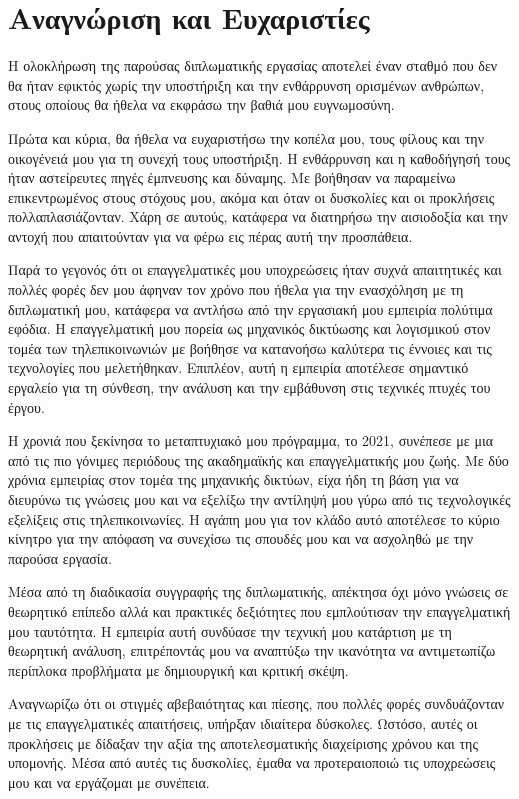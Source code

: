 
\chapter{Αναγνώριση και Ευχαριστίες}

Η ολοκλήρωση της παρούσας διπλωματικής εργασίας αποτελεί έναν σταθμό που δεν θα ήταν εφικτός χωρίς την υποστήριξη και την ενθάρρυνση ορισμένων ανθρώπων, στους οποίους θα ήθελα να εκφράσω την βαθιά μου ευγνωμοσύνη.

Πρώτα και κύρια, θα ήθελα να ευχαριστήσω την κοπέλα μου, τους φίλους και την οικογένειά μου για τη συνεχή τους υποστήριξη. Η ενθάρρυνση και η καθοδήγησή τους ήταν αστείρευτες πηγές έμπνευσης και δύναμης. Με βοήθησαν να παραμείνω επικεντρωμένος στους στόχους μου, ακόμα και όταν οι δυσκολίες και οι προκλήσεις πολλαπλασιάζονταν. Χάρη σε αυτούς, κατάφερα να διατηρήσω την αισιοδοξία και την αντοχή που απαιτούνταν για να φέρω εις πέρας αυτή την προσπάθεια.

Παρά το γεγονός ότι οι επαγγελματικές μου υποχρεώσεις ήταν συχνά απαιτητικές και πολλές φορές δεν μου άφηναν τον χρόνο που ήθελα για την ενασχόληση με τη διπλωματική μου, κατάφερα να αντλήσω από την εργασιακή μου εμπειρία πολύτιμα εφόδια. Η επαγγελματική μου πορεία ως μηχανικός δικτύωσης και λογισμικού στον τομέα των τηλεπικοινωνιών με βοήθησε να κατανοήσω καλύτερα τις έννοιες και τις τεχνολογίες που μελετήθηκαν. Επιπλέον, αυτή η εμπειρία αποτέλεσε σημαντικό εργαλείο για τη σύνθεση, την ανάλυση και την εμβάθυνση στις τεχνικές πτυχές του έργου.

Η χρονιά που ξεκίνησα το μεταπτυχιακό μου πρόγραμμα, το 2021, συνέπεσε με μια από τις πιο γόνιμες περιόδους της ακαδημαϊκής και επαγγελματικής μου ζωής. Με δύο χρόνια εμπειρίας στον τομέα της μηχανικής δικτύων, είχα ήδη τη βάση για να διευρύνω τις γνώσεις μου και να εξελίξω την αντίληψή μου γύρω από τις τεχνολογικές εξελίξεις στις τηλεπικοινωνίες. Η αγάπη μου για τον κλάδο αυτό αποτέλεσε το κύριο κίνητρο για την απόφαση να συνεχίσω τις σπουδές μου και να ασχοληθώ με την παρούσα εργασία.

Μέσα από τη διαδικασία συγγραφής της διπλωματικής, απέκτησα όχι μόνο γνώσεις σε θεωρητικό επίπεδο αλλά και πρακτικές δεξιότητες που εμπλούτισαν την επαγγελματική μου ταυτότητα. Η εμπειρία αυτή συνδύασε την τεχνική μου κατάρτιση με τη θεωρητική ανάλυση, επιτρέποντάς μου να αναπτύξω την ικανότητα να αντιμετωπίζω περίπλοκα προβλήματα με δημιουργική και κριτική σκέψη.

Αναγνωρίζω ότι οι στιγμές αβεβαιότητας και πίεσης, που πολλές φορές συνδυάζονταν με τις επαγγελματικές απαιτήσεις, υπήρξαν ιδιαίτερα δύσκολες. Ωστόσο, αυτές οι προκλήσεις με δίδαξαν την αξία της αποτελεσματικής διαχείρισης χρόνου και της υπομονής. Μέσα από αυτές τις δυσκολίες, έμαθα να προτεραιοποιώ τις υποχρεώσεις μου και να εργάζομαι με συνέπεια.

